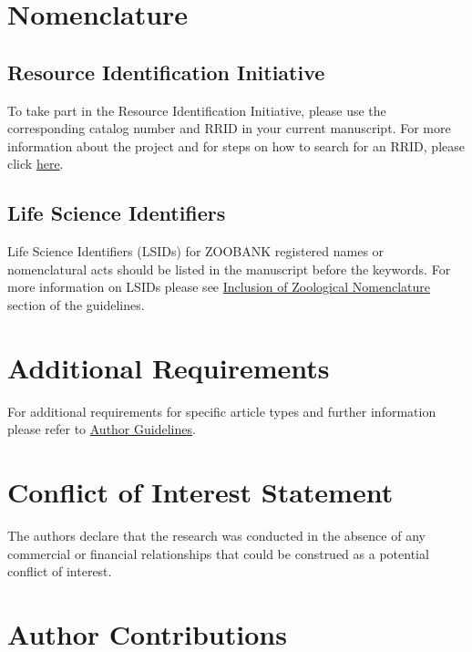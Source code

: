 \documentclass[utf8]{frontiersSCNS} %
\begin{document}
\section{Nomenclature}

\subsection{Resource Identification Initiative}
To take part in the Resource Identification Initiative, please use the corresponding catalog number and RRID in your current manuscript. For more information about the project and for steps on how to search for an RRID, please click \href{http://www.frontiersin.org/files/pdf/letter_to_author.pdf}{here}.

\subsection{Life Science Identifiers}
Life Science Identifiers (LSIDs) for ZOOBANK registered names or nomenclatural acts should be listed in the manuscript before the keywords. For more information on LSIDs please see \href{http://www.frontiersin.org/about/AuthorGuidelines#InclusionofZoologicalNomenclature}{Inclusion of Zoological Nomenclature} section of the guidelines.


\section{Additional Requirements}

For additional requirements for specific article types and further information please refer to \href{http://www.frontiersin.org/about/AuthorGuidelines#AdditionalRequirements}{Author Guidelines}.

\section*{Conflict of Interest Statement}

The authors declare that the research was conducted in the absence of any commercial or financial relationships that could be construed as a potential conflict of interest.

\section*{Author Contributions}
\end{document}

